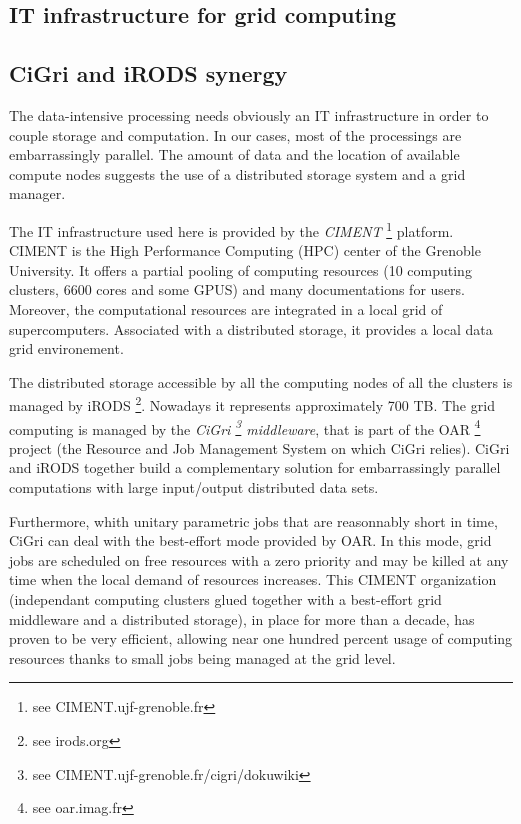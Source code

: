 \documentclass[a4paper, 10pt]{article}
\begin{document}
\begin{multicols}{2}



\section{IT infrastructure for grid computing}%


\subsection{CiGri and iRODS synergy}

The data-intensive processing
needs obviously an IT infrastructure in order to couple storage and computation.
In our cases, most of the processings are embarrassingly parallel.
The amount of data and the location of available compute nodes suggests the use of a 
distributed storage system and a grid manager.


The IT infrastructure used here is provided by the \emph{CIMENT} \footnote{see CIMENT.ujf-grenoble.fr} 
platform. CIMENT is the High Performance Computing (HPC) center of the Grenoble University. It offers a partial pooling of computing 
resources (10 computing clusters, 6600 cores and some GPUS) and many documentations for users. 
Moreover, the computational resources are integrated in a local grid of supercomputers. Associated with a distributed storage,
it provides a local data grid environement.

The distributed storage accessible by all the computing nodes of all the clusters is managed by iRODS \footnote{see irods.org}.
Nowadays it represents approximately 700 TB. The grid computing is managed by the \emph{CiGri 
\footnote{see CIMENT.ujf-grenoble.fr/cigri/dokuwiki} middleware}, that is part of the OAR \footnote{see oar.imag.fr} \cite{key:CDGHMMNR, key:CHR2009} project (the Resource and Job Management System on which CiGri relies). CiGri and iRODS together build a complementary solution for embarrassingly parallel computations with large input/output distributed data sets.

Furthermore, whith unitary parametric jobs that are reasonnably short in time, CiGri can deal with the best-effort mode provided by OAR. In this mode, grid jobs are scheduled on free resources with a zero priority and may be killed at any time when the local demand of resources increases. This CIMENT organization (independant computing clusters glued together with a best-effort grid middleware and a distributed storage), in place for more than a decade, has proven to be very efficient, allowing near one hundred percent usage of computing resources thanks to small jobs being managed at the grid level.


\end{multicols}
\end{document}
